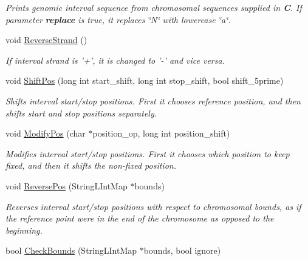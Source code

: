 \begin{CompactItemize}
\begin{CompactList}\small\item\em Prints genomic interval sequence from chromosomal sequences supplied in {\bf C}. If parameter {\bf replace} is true, it replaces \char`\"{}N\char`\"{} with lowercase \char`\"{}a\char`\"{}. \item\end{CompactList}\item 
\hypertarget{classGenomicInterval_a410816fa04d76edd7caeb9ae2442ae1}{
void \hyperlink{classGenomicInterval_a410816fa04d76edd7caeb9ae2442ae1}{ReverseStrand} ()}
\label{classGenomicInterval_a410816fa04d76edd7caeb9ae2442ae1}

\begin{CompactList}\small\item\em If interval strand is '+', it is changed to '-' and vice versa. \item\end{CompactList}\item 
void \hyperlink{classGenomicInterval_5cc57eb991cca3f1e1b8bd7ca8acaa03}{ShiftPos} (long int start\_\-shift, long int stop\_\-shift, bool shift\_\-5prime)
\begin{CompactList}\small\item\em Shifts interval start/stop positions. First it chooses reference position, and then shifts start and stop positions separately. \item\end{CompactList}\item 
void \hyperlink{classGenomicInterval_96b34b76019001c4751d4c4f868ee24d}{ModifyPos} (char $\ast$position\_\-op, long int position\_\-shift)
\begin{CompactList}\small\item\em Modifies interval start/stop positions. First it chooses which position to keep fixed, and then it shifts the non-fixed position. \item\end{CompactList}\item 
\hypertarget{classGenomicInterval_bf416450f25b579dfb76b2bd6a81aa6a}{
void \hyperlink{classGenomicInterval_bf416450f25b579dfb76b2bd6a81aa6a}{ReversePos} (StringLIntMap $\ast$bounds)}
\label{classGenomicInterval_bf416450f25b579dfb76b2bd6a81aa6a}

\begin{CompactList}\small\item\em Reverses interval start/stop positions with respect to chromosomal bounds, as if the reference point were in the end of the chromosome as opposed to the beginning. \item\end{CompactList}\item 
\hypertarget{classGenomicInterval_1834c0f1217585398de74119d680ab7b}{
bool \hyperlink{classGenomicInterval_1834c0f1217585398de74119d680ab7b}{CheckBounds} (StringLIntMap $\ast$bounds, bool ignore)}
\label{classGenomicInterval_1834c0f1217585398de74119d680ab7b}


\end{CompactItemize}
